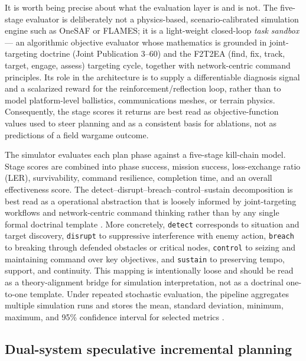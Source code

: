 It is worth being precise about what the evaluation layer is and is not. The five-stage evaluator is deliberately not a physics-based, scenario-calibrated simulation engine such as OneSAF or FLAMES; it is a light-weight closed-loop \emph{task sandbox} --- an algorithmic objective evaluator whose mathematics is grounded in joint-targeting doctrine (Joint Publication 3--60) and the F2T2EA (find, fix, track, target, engage, assess) targeting cycle, together with network-centric command principles. Its role in the architecture is to supply a differentiable diagnosis signal and a scalarized reward for the reinforcement/reflection loop, rather than to model platform-level ballistics, communications meshes, or terrain physics. Consequently, the stage scores it returns are best read as objective-function values used to steer planning and as a consistent basis for ablations, not as predictions of a field wargame outcome.

The simulator evaluates each plan phase against a five-stage kill-chain model. Stage scores are combined into phase success, mission success, loss-exchange ratio (LER), survivability, command resilience, completion time, and an overall effectiveness score. The detect--disrupt--breach--control--sustain decomposition is best read as a operational abstraction that is loosely informed by joint-targeting workflows and network-centric command thinking rather than by any single formal doctrinal template \citep{jointchiefs2013jointtargeting,tirpak2000f2t2ea,alberts1999networkcentric}. More concretely, \texttt{detect} corresponds to situation and target discovery, \texttt{disrupt} to suppressive interference with enemy action, \texttt{breach} to breaking through defended obstacles or critical nodes, \texttt{control} to seizing and maintaining command over key objectives, and \texttt{sustain} to preserving tempo, support, and continuity. This mapping is intentionally loose and should be read as a theory-alignment bridge for simulation interpretation, not as a doctrinal one-to-one template. Under repeated stochastic evaluation, the pipeline aggregates multiple simulation runs and stores the mean, standard deviation, minimum, maximum, and 95\% confidence interval for selected metrics \citep{law2015simulation}.

\subsection{Dual-system speculative incremental planning}
\label{sec:dual-system}

